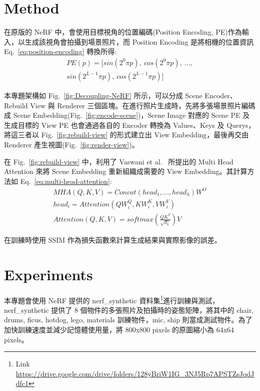 \documentclass[10pt,twocolumn,letterpaper]{article}
\begin{document}
\begin{CJK}{UTF8}{bkai}
   \section{Method}

   在原版的 NeRF 中，會使用目標視角的位置編碼(Position Encoding,
   PE)作為輸入，以生成該視角會拍攝到場景照片，而 Position Encoding
   是將相機的位置資訊 Eq.~\ref{eq:position-encoding} 轉換所得:
   \begin{equation}
      \begin{aligned}
         PE(p)=[sin(2^{0}{\pi}{p}),~cos(2^{0}{\pi}{p}),~..., \\
         sin(2^{L-1}{\pi}{p}),~cos(2^{L-1}{\pi}{p})]
      \end{aligned}
      \label{eq:position-encoding}
   \end{equation}

   本專題架構如 Fig.~\ref{fig:Decoupling-NeRF} 所示，可以分成 Scene Encoder、Rebuild View 與 Renderer
   三個區塊。在進行照片生成時，先將多張場景照片編碼成 Scene Embedding(Fig.~\ref{fig:encode-scene})，Scene Image 對應的 Scene PE 及生成目標的 View
   PE 也會通過各自的 Encoder 轉換為 Values、Keys 及 Querys，將這三者以 Fig.~\ref{fig:rebuild-view} 的形式建立出
   View Embedding，最後再交由 Renderer 產生視圖(Fig.~\ref{fig:render-view})。

   在 Fig.~\ref{fig:rebuild-view} 中，利用了 Vaswani et al.~\cite{AttentionIsAllYouNeed} 所提出的
   Multi Head Attention 來將 Scene Embedding 重新組織成需要的 View Embedding。其計算方法如 Eq.~\ref{eq:multi-head-attention}:
   \begin{equation}
      \begin{aligned}
         MHA(Q, K, V) = Concat(head_{1},...,head_{h})W^{O}      \\
         head_{i} = Attention(QW^{Q}_{i},KW^{K}_{i},VW^{V}_{i}) \\
         Attention(Q, K, V ) = softmax(\frac{QK^{T}}{\sqrt{d_{k}}})V
      \end{aligned}
      \label{eq:multi-head-attention}
   \end{equation}

   在訓練時使用 SSIM\cite{SSIM} 作為損失函數來計算生成結果與實際影像的誤差。

   \section{Experiments}
   本專題會使用 NeRF 提供的 nerf\_synthetic 資料集\footnote{Link \href{https://drive.google.com/drive/folders/128yBriW1IG_3NJ5Rp7APSTZsJqdJdfc1}{https://drive.google.com/drive/folders/128yBriW1IG\_3NJ5Rp7APSTZsJqdJdfc1}}進行訓練與測試，nerf\_synthetic 提供了
   8 個物件的多張照片及拍攝時的姿態矩陣，將其中的 chair, drums, ficus, hotdog, lego, materials 訓練物件，mic, ship 則當成測試物件。為了加快訓練速度並減少記憶體使用量，將 800x800 pixels 的原圖縮小為 64x64 pixels。


\end{CJK}
\end{document}
